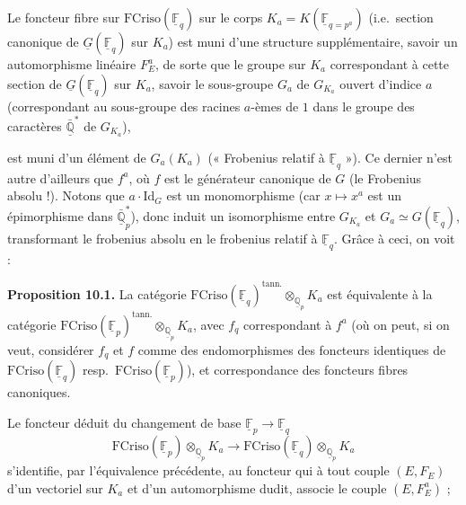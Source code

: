 \documentclass[11pt,a4paper]{article}
\begin{document}
Le foncteur fibre   sur
$\mathrm{FCriso}(\underline{\mathbb{F}}_{q})$  sur le corps
$K_{a} = K(\underline{\mathbb{F}}_{q = p^{a}})$ (i.e.\ section canonique de
$\underline{G}(\underline{\mathbb{F}}_{q})$ sur $K_{a}$) est muni d'une
structure supplémentaire, savoir un automorphisme linéaire $F_{E}^{a}$, de
sorte que le groupe  sur  $K_{a}$ correspondant
à cette section de $\underline{G}(\underline{\mathbb{F}}_{q})$ sur $K_{a}$,
savoir le sous-groupe $G_{a}$ de $G_{K_{a}}$ ouvert d'indice $a$
(correspondant au sous-groupe des racines $a$-èmes de $1$ dans le groupe des
caractères $\bar{\underline{\mathbb{Q}}}^{*}$ de $G_{K_{a}}$),

est muni d'un élément  de $G_{a}(K_{a})$ (« Frobenius relatif à
$\underline{\mathbb{F}}_{q}$ »). Ce dernier n'est autre d'ailleurs que
$f^{a}$, où $f$ est le générateur canonique de $G$ (le Frobenius absolu !).
 Notons que
$a \cdot \mathrm{Id}_{G}$ est un monomorphisme (car $x \mapsto x^{a}$ est un
épimorphisme dans $\bar{\underline{\mathbb{Q}}}^{*}_{p}$), donc induit un
isomorphisme entre $G_{K_{a}}$ et
$G_{a} \simeq G(\underline{\mathbb{F}}_{q})$, transformant le frobenius
 absolu en le frobenius relatif à $\underline{\mathbb{F}}_{q}$.
Grâce à ceci, on voit :

\textbf{Proposition 10.1.} La catégorie
$\mathrm{FCriso}(\underline{\mathbb{F}}_{q})^{\mathrm{tann.}}
\otimes_{\underline{\mathbb{Q}}_{p}} K_{a}$ est équivalente à la catégorie
$\mathrm{FCriso}(\underline{\mathbb{F}}_{p})^{\mathrm{tann.}}
\otimes_{\underline{\mathbb{Q}}_{p}} K_{a}$, avec $f_{q}$ correspondant à
$f^{a}$ (où on peut, si on veut, considérer $f_{q}$ et $f$ comme des
endomorphismes des foncteurs identiques de
$\mathrm{FCriso}(\underline{\mathbb{F}}_{q})$ resp.\ $\mathrm{FCriso}(\underline{\mathbb{F}}_{p})$), et correspondance des foncteurs
fibres canoniques.

Le foncteur déduit du changement de base $\underline{\mathbb{F}}_{p} \to
\underline{\mathbb{F}}_{q}$
\[
\mathrm{FCriso}(\underline{\mathbb{F}}_{p})
  \otimes_{\underline{\mathbb{Q}}_{p}} K_{a}
\longrightarrow
\mathrm{FCriso}(\underline{\mathbb{F}}_{q})
  \otimes_{\underline{\mathbb{Q}}_{p}} K_{a}
\]
s'identifie, par l'équivalence précédente, au foncteur qui à tout couple
$(E, F_{E})$ d'un vectoriel sur $K_{a}$ et d'un automorphisme dudit, associe le
couple $(E, F_{E}^{a})$ ; 
\end{document}
